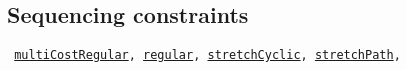 \subsection{Sequencing constraints}\label{model:theregularconstraint}\hypertarget{model:theregularconstraint}{}
\begin{notedef}\tt
  \hyperlink{multicostregular:multicostregularconstraint}{multiCostRegular}, \hyperlink{regular:regularconstraint}{regular}, \hyperlink{stretchcyclic:stretchcyclicconstraint}{stretchCyclic}, \hyperlink{stretchpath:stretchpathconstraint}{stretchPath}, 
\end{notedef}

